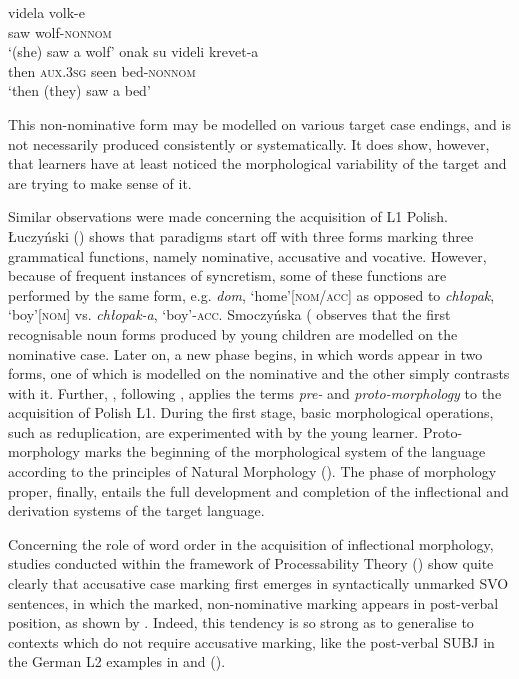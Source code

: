 \ea%
    \label{ex:01:4}
    \ea
    \label{ex:01:4a}
    \gll    videla volk-e\\
            saw  wolf-\textsc{nonnom}\\
    \glt    ‘(she) saw a wolf’
    \ex
    \label{ex:01:4b}
    \gll    onak su videli krevet-a\\
            then  \textsc{aux.3sg}  seen  bed-\textsc{nonnom}\\
    \glt    ‘then (they) saw a bed’
    \z
\z

This non-nominative form may be modelled on various target case endings, and is not necessarily produced consistently or systematically. It does show, however, that learners have at least noticed the morphological variability of the target and are trying to make sense of it.

Similar observations were made concerning the acquisition of L1 Polish. Łuczyński (\citeyear{Łuczyński2002, Łuczyński2004, Łuczyński2010}) shows that paradigms start off with three forms marking three grammatical functions, namely nominative, accusative and vocative. However, because of frequent instances of syncretism, some of these functions are performed by the same form, e.g. \textit{dom}, ‘home’\textsc{[nom/acc]} as opposed to \textit{chłopak}, ‘boy’\textsc{[nom]} vs. \textit{chłopak-a}, ‘boy’-\textsc{acc}. Smoczyńska (\citeyear{Smoczyńska1972, Smoczyńska1985, Smoczyńska1997} observes that the first recognisable noun forms produced by young children are modelled on the nominative case. Later on, a new phase begins, in which words appear in two forms, one of which is modelled on the nominative and the other simply contrasts with it. Further, \citet{Dziubalska-Kołaczyk1997}, following \citet{DresslerKarpf1994}, applies the terms \textit{pre-} and \textit{proto-morphology} to the acquisition of Polish L1. During the first stage, basic morphological operations, such as reduplication, are experimented with by the young learner. Proto-morphology marks the beginning of the morphological system of the language according to the principles of Natural Morphology (\citealt{Dressler1985, Dressler1987, Dressler2011, Wurzel1989, Crocco-Galeas1998}). The phase of morphology proper, finally, entails the full development and completion of the inflectional and derivation systems of the target language.

Concerning the role of word order in the acquisition of inflectional morphology, studies conducted within the framework of Processability Theory (\citealt{Pienemann1998, Pienemann2015, Di-BiaseBettoni2015}) show quite clearly that accusative case marking first emerges in syntactically unmarked SVO sentences, in which the marked, non-nominative marking appears in post-verbal position, as shown by  \citet[190]{ArtoniMagnani2015} . Indeed, this tendency is so strong as to generalise to contexts which do not require accusative marking, like the post-verbal SUBJ in the German L2 examples in  \citep[490]{Baten2011} and  (\citealt[235]{DiehlEtAl2000}).


